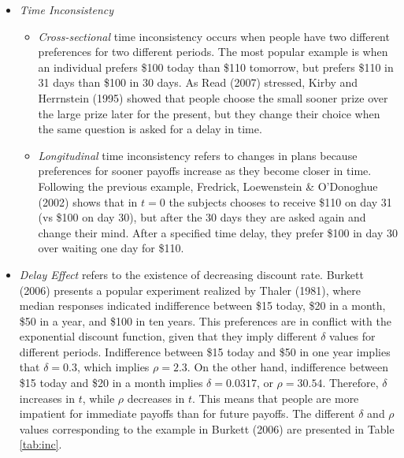 \documentclass[]{article}
\providecommand{\tightlist}{%
  \setlength{\itemsep}{0pt}\setlength{\parskip}{0pt}}
\begin{document}
\begin{itemize}
\tightlist
\item
  \emph{Time Inconsistency}\\

  \begin{itemize}
  \tightlist
  \item
    \emph{Cross-sectional} time inconsistency occurs when people have two different preferences for two different periods. The most popular example is when an individual prefers \$100 today than \$110 tomorrow, but prefers \$110 in 31 days than \$100 in 30 days. As Read (2007) stressed, Kirby and Herrnstein (1995) showed that people choose the small sooner prize over the large prize later for the present, but they change their choice when the same question is asked for a delay in time.\\
  \item
    \emph{Longitudinal} time inconsistency refers to changes in plans because preferences for sooner payoffs increase as they become closer in time. Following the previous example, Fredrick, Loewenstein \& O'Donoghue (2002) shows that in \(t=0\) the subjects chooses to receive \$110 on day 31 (vs \$100 on day 30), but after the 30 days they are asked again and change their mind. After a specified time delay, they prefer \$100 in day 30 over waiting one day for \$110.\\
  \end{itemize}
\item
  \emph{Delay Effect} refers to the existence of decreasing discount rate. Burkett (2006) presents a popular experiment realized by Thaler (1981), where median responses indicated indifference between \$15 today, \$20 in a month, \$50 in a year, and \$100 in ten years. This preferences are in conflict with the exponential discount function, given that they imply different \(\delta\) values for different periods. Indifference between \$15 today and \$50 in one year implies that \(\delta=0.3\), which implies \(\rho=2.3\). On the other hand, indifference between \$15 today and \$20 in a month implies \(\delta=0.0317\), or \(\rho=30.54\). Therefore, \(\delta\) increases in \(t\), while \(\rho\) decreases in \(t\). This means that people are more impatient for immediate payoffs than for future payoffs. The different \(\delta\) and \(\rho\) values corresponding to the example in Burkett (2006) are presented in Table \ref{tab:inc}.\\
\end{itemize}
\end{document}
